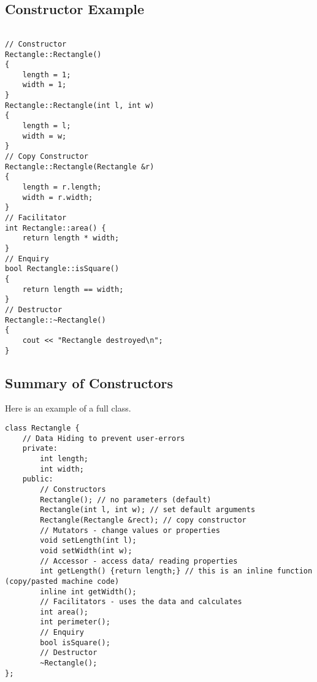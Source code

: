 \documentclass[a4paper,12pt]{book}
\begin{document}
\subsection{Constructor Example}

\begin{lstlisting}

// Constructor
Rectangle::Rectangle()
{
    length = 1;
    width = 1;
}
Rectangle::Rectangle(int l, int w)
{
    length = l;
    width = w;
}
// Copy Constructor
Rectangle::Rectangle(Rectangle &r)
{
    length = r.length;
    width = r.width;
}
// Facilitator
int Rectangle::area() {
    return length * width;
}
// Enquiry
bool Rectangle::isSquare()
{
    return length == width;
}
// Destructor
Rectangle::~Rectangle()
{
    cout << "Rectangle destroyed\n";
}

\end{lstlisting}

\subsection{Summary of Constructors}
Here is an example of a full class.
\begin{lstlisting}
class Rectangle {
    // Data Hiding to prevent user-errors
    private:
        int length;
        int width;
    public:
        // Constructors
        Rectangle(); // no parameters (default)
        Rectangle(int l, int w); // set default arguments
        Rectangle(Rectangle &rect); // copy constructor
        // Mutators - change values or properties
        void setLength(int l);
        void setWidth(int w);
        // Accessor - access data/ reading properties
        int getLength() {return length;} // this is an inline function (copy/pasted machine code)
        inline int getWidth();
        // Facilitators - uses the data and calculates
        int area();
        int perimeter();
        // Enquiry
        bool isSquare();
        // Destructor
        ~Rectangle();
};

\end{lstlisting}
\end{document}
